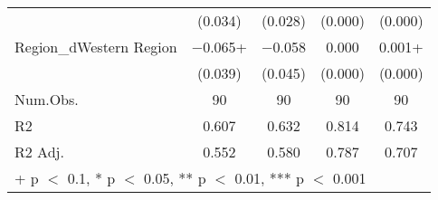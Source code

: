 \begin{table}
\begin{tabular}[t]{lcccc}
 & (\num{0.034}) & (\num{0.028}) & (\num{0.000}) & (\num{0.000})\\
Region\_dWestern Region & \num{-0.065}+ & \num{-0.058} & \num{0.000} & \num{0.001}+\\
 & (\num{0.039}) & (\num{0.045}) & (\num{0.000}) & (\num{0.000})\\
\midrule
Num.Obs. & \num{90} & \num{90} & \num{90} & \num{90}\\
R2 & \num{0.607} & \num{0.632} & \num{0.814} & \num{0.743}\\
R2 Adj. & \num{0.552} & \num{0.580} & \num{0.787} & \num{0.707}\\
\bottomrule
\multicolumn{5}{l}{\rule{0pt}{1em}+ p $<$ 0.1, * p $<$ 0.05, ** p $<$ 0.01, *** p $<$ 0.001}\\
\end{tabular}
\end{table}

